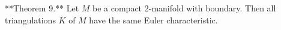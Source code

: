 **Theorem 9.** Let $M$ be a compact 2-manifold with boundary. Then all triangulations $K$ of $M$ have the same Euler characteristic.

